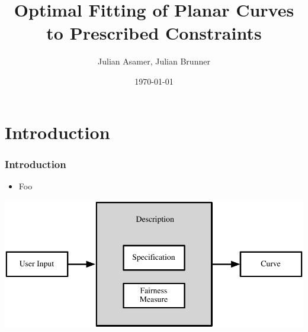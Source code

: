 \documentclass{beamer}
\title{Optimal Fitting of Planar Curves to Prescribed Constraints}
\author{Julian Asamer, Julian Brunner}
\date{\today}
\begin{document}
	\begin{frame}
		\titlepage
	\end{frame}

	\section{Introduction}

		\begin{frame}
			\frametitle{Introduction}
			\begin{itemize}
				\item Foo
			\end{itemize}
			\begin{centering}
				\includegraphics[width=\textwidth]{../resources/description-based_curves.pdf}\\
			\end{centering}
		\end{frame}
\end{document}
